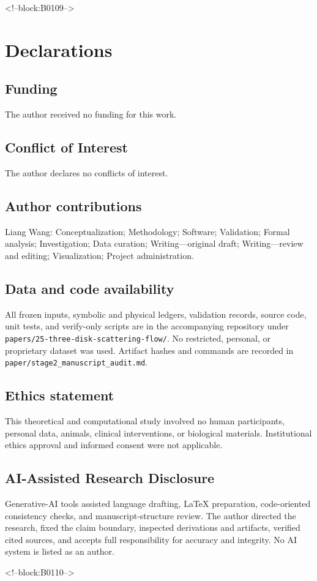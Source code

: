 \documentclass[11pt,a4paper]{article}
\theoremstyle{definition}
\theoremstyle{remark}
\begin{document}
<!--block:B0109-->
\section*{Declarations}
\subsection*{Funding}
The author received no funding for this work.
\subsection*{Conflict of Interest}
The author declares no conflicts of interest.
\subsection*{Author contributions}
Liang Wang: Conceptualization; Methodology; Software; Validation; Formal analysis; Investigation; Data curation; Writing---original draft; Writing---review and editing; Visualization; Project administration.
\subsection*{Data and code availability}
All frozen inputs, symbolic and physical ledgers, validation records, source code, unit tests, and verify-only scripts are in the accompanying repository under \texttt{papers/25-three-disk-scattering-flow/}. No restricted, personal, or proprietary dataset was used. Artifact hashes and commands are recorded in \texttt{paper/stage2\_manuscript\_audit.md}.
\subsection*{Ethics statement}
This theoretical and computational study involved no human participants, personal data, animals, clinical interventions, or biological materials. Institutional ethics approval and informed consent were not applicable.
\subsection*{AI-Assisted Research Disclosure}
Generative-AI tools assisted language drafting, LaTeX preparation, code-oriented consistency checks, and manuscript-structure review. The author directed the research, fixed the claim boundary, inspected derivations and artifacts, verified cited sources, and accepts full responsibility for accuracy and integrity. No AI system is listed as an author.

<!--block:B0110-->


\end{document}
